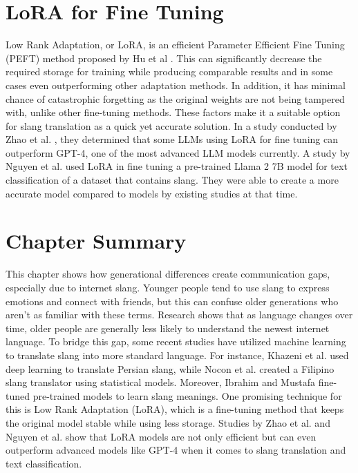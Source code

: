 \section{LoRA for Fine Tuning}
Low Rank Adaptation, or LoRA, is an efficient Parameter Efficient Fine Tuning (PEFT) method proposed by Hu et al \cite{hu2021loralowrankadaptationlarge}.
This can significantly decrease the required storage for training while producing comparable results and in some cases even outperforming other adaptation methods.
In addition, it has minimal chance of catastrophic forgetting as the original weights are not being tampered with, unlike other fine-tuning methods.
These factors make it a suitable option for slang translation as a quick yet accurate solution.
In a study conducted by Zhao et al. \cite{zhao2024loraland310finetuned}, they determined that some LLMs using LoRA for fine tuning can outperform GPT-4, one of the most advanced LLM models currently.
A study by Nguyen et al. \cite{nguyen2023finetuningllama2large} used LoRA in fine tuning a pre-trained Llama 2 7B model for text classification of a dataset that contains slang.
They were able to create a more accurate model compared to models by existing studies at that time. 

\section{Chapter Summary}
This chapter shows how generational differences create communication gaps, especially due to internet slang.
Younger people tend to use slang to express emotions and connect with friends, but this can confuse older generations who aren't as familiar with these terms.
Research shows that as language changes over time, older people are generally less likely to understand the newest internet language.
To bridge this gap, some recent studies have utilized machine learning to translate slang into more standard language.
For instance, Khazeni et al. \cite{Khazeni} used deep learning to translate Persian slang, while Nocon et al. \cite{Nocon_Kho_Arroyo_2018} created a Filipino slang translator using statistical models.
Moreover, Ibrahim and Mustafa \cite{Abdulstar_Ibrahim_Shareef_Mustafa_2023} fine-tuned pre-trained models to learn slang meanings.
One promising technique for this is Low Rank Adaptation (LoRA), which is a fine-tuning method that keeps the original model stable while using less storage.
Studies by Zhao et al. \cite{zhao2024loraland310finetuned} and Nguyen et al. \cite{nguyen2023finetuningllama2large} show that LoRA models are not only efficient but can even outperform advanced models like GPT-4 when it comes to slang translation and text classification. 
